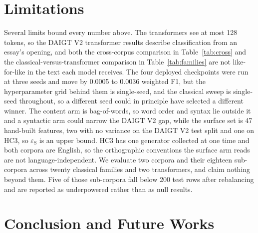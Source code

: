 \documentclass[conference,a4paper]{IEEEtran}
\begin{document}
\section{Limitations}
\label{sec:limitations}

Several limits bound every number above. The transformers see at most 128 tokens, so the DAIGT V2 transformer results describe classification from an essay's opening, and both the cross-corpus comparison in Table~\ref{tab:cross} and the classical-versus-transformer comparison in Table~\ref{tab:families} are not like-for-like in the text each model receives. The four deployed checkpoints were run at three seeds and move by 0.0005 to 0.0036 weighted F1, but the hyperparameter grid behind them is single-seed, and the classical sweep is single-seed throughout, so a different seed could in principle have selected a different winner. The content arm is bag-of-words, so word order and syntax lie outside it and a syntactic arm could narrow the DAIGT V2 gap, while the surface set is 47 hand-built features, two with no variance on the DAIGT V2 test split and one on HC3, so $\varepsilon_{\mathrm{S}}$ is an upper bound. HC3 has one generator collected at one time and both corpora are English, so the orthographic conventions the surface arm reads are not language-independent. We evaluate two corpora and their eighteen sub-corpora across twenty classical families and two transformers, and claim nothing beyond them. Five of those sub-corpora fall below 200 test rows after rebalancing and are reported as underpowered rather than as null results.

\section{Conclusion and Future Works}
\label{sec:conclusion}
\end{document}
